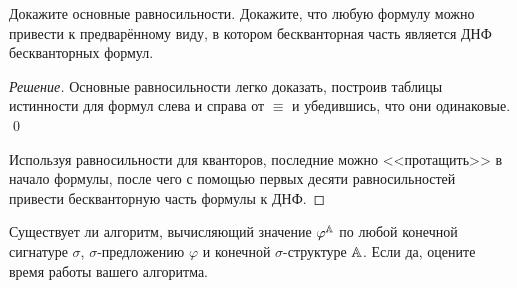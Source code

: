     \begin{problem}[2]
        Докажите основные равносильности. Докажите, что любую формулу можно привести к предварённому виду, в котором бескванторная часть является ДНФ бескванторных формул.
    \end{problem}
    \begin{proof}[Решение]
        Основные равносильности легко доказать, построив таблицы истинности для формул слева и справа от \(\equiv\) и убедившись, что они одинаковые. \qed

        Используя равносильности для кванторов, последние можно <<протащить>> в начало формулы, после чего с помощью первых десяти равносильностей привести бескванторную часть формулы к ДНФ. 
    \end{proof}

    \begin{problem}[3]
        Существует ли алгоритм, вычисляющий значение \(\varphi^{\mathbb{A}}\) по любой конечной сигнатуре \(\sigma\), \(\sigma\)-предложению \(\varphi\) и конечной \(\sigma\)-структуре \(\mathbb{A}\). Если да, оцените время работы вашего алгоритма.
    \end{problem}
